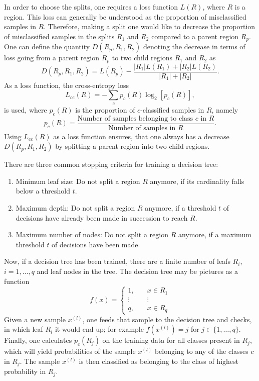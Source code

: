 \documentclass[a4paper,11pt]{article}
\numberwithin{equation}{section}
\begin{document}
{In order to choose the splits, one requires a loss function $L(R)$, where $R$ is a region. This loss can generally be understood as the proportion of misclassified samples in $R$. Therefore, making a split one would like to decrease the proportion of misclassified samples in the splits $R_1$ and $R_2$ compared to a parent region $R_p$. One can define the quantity $D(R_p,R_1,R_2)$ denoting the decrease in terms of loss going from a parent region $R_p$ to two child regions $R_1$ and $R_2$ as \begin{equation}
	D(R_p, R_1, R_2) = L(R_p) - \frac{|R_1|L(R_1)+|R_2|L(R_2)}{|R_1|+|R_2|}.
\end{equation}
As a loss function, the cross-entropy loss \begin{equation}
	L_{ce}(R) = -\sum_c p_c(R)\log_2\left[p_c(R)\right],
\end{equation} is used, where $p_c(R)$ is the proportion of $c$-classified samples in $R$, namely \begin{equation}
p_c(R) = \frac{\text{Number of samples belonging to class $c$ in $R$}}{\text{Number of samples in $R$}}.
\end{equation} Using $L_{ce}(R)$ as a loss function ensures, that one always has a decrease $D(R_p, R_1, R_2)$ by splitting a parent region into two child regions.

There are three common stopping criteria for training a decision tree:
\begin{enumerate}
	\item Minimum leaf size: Do not split a region $R$ anymore, if its cardinality falls below a threshold $t$.
	\item Maximum depth: Do not split a region $R$ anymore, if a threshold $t$ of decisions have already been made in succession to reach $R$.
	\item Maximum number of nodes: Do not split a region $R$ anymore, if a maximum threshold $t$ of decisions have been made.
\end{enumerate}

Now, if a decision tree has been trained, there are a finite number of leafs $R_i$, $i=1,\dots,q$ and leaf nodes in the tree. The decision tree may be pictures as a function \begin{equation}
	f(x) = \begin{cases}
		1, &\quad x \in R_1 \\
		\vdots &\quad \vdots \\
		q, &\quad x \in R_q
	\end{cases}
\end{equation} Given a new sample $x^{(l)}$, one feeds that sample to the decision tree and checks, in which leaf $R_i$ it would end up; for example $f(x^{(l)}) = j$ for $j \in \{1,\dots,q\}$. Finally, one calculates $p_c(R_j)$ on the training data for all classes present in $R_j$, which will yield probabilities of the sample $x^{(l)}$ belonging to any of the classes $c$ in $R_j$. The sample $x^{(l)}$ is then classified as belonging to the class of highest probability in $R_j$.
}
\end{document}
